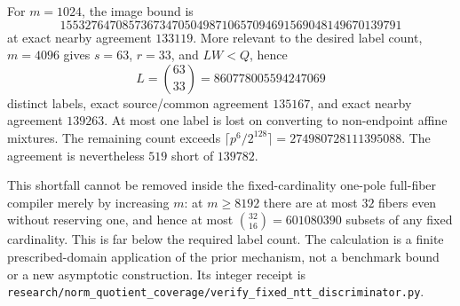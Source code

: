 For $m=1024$, the image bound is
\[
 1553276470857367347050498710657094691569048149670139791
\]
at exact nearby agreement $133119$.  More relevant to the desired
label count, $m=4096$ gives $s=63$, $r=33$, and $LW<Q$, hence
\[
 L=\binom{63}{33}=860778005594247069
\]
distinct labels, exact source/common agreement $135167$, and exact
nearby agreement $139263$.  At most one label is lost on converting
to non-endpoint affine mixtures.  The remaining count exceeds
$\lceil p^6/2^{128}\rceil=274980728111395088$.
The agreement is nevertheless $519$ short of $139782$.

This shortfall cannot be removed inside the fixed-cardinality one-pole
full-fiber compiler merely by increasing $m$: at $m\ge8192$ there
are at most $32$ fibers even without reserving one, and hence at most
$\binom{32}{16}=601080390$ subsets of any fixed cardinality.
This is far below the required label count.  The calculation is a
finite prescribed-domain application of the prior mechanism, not a
benchmark bound or a new asymptotic construction.
Its integer receipt is
\nolinkurl{research/norm_quotient_coverage/verify_fixed_ntt_discriminator.py}.
